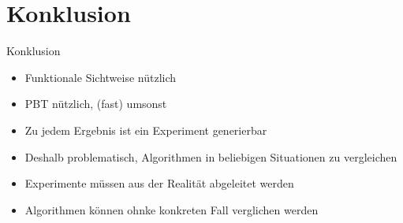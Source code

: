 \documentclass[aspectratio=169,10pt]{beamer}
\begin{document}
\section{Konklusion}
\begin{frame}[t,fragile]{Konklusion}
	\begin{itemize}
		\item Funktionale Sichtweise n\"utzlich
		\item PBT n\"utzlich, (fast) umsonst
		\item Zu jedem Ergebnis ist ein Experiment generierbar
		\item Deshalb problematisch, Algorithmen in beliebigen Situationen zu vergleichen
		\item Experimente m\"ussen aus der Realit\"at abgeleitet werden
		\item Algorithmen k\"onnen ohnke konkreten Fall verglichen werden
	\end{itemize}
\end{frame}

\end{document}
